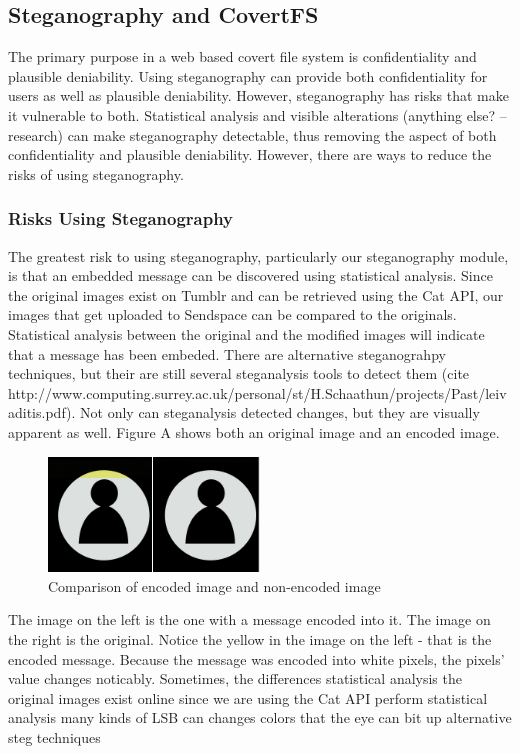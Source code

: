 \subsection{Steganography and CovertFS}
The primary purpose in a web based covert file system is confidentiality and plausible deniability. Using steganography can provide both confidentiality for users as well as plausible deniability. However, steganography has risks that make it vulnerable to both. Statistical analysis and visible alterations (anything else? -- research) can make steganography detectable, thus removing the aspect of both confidentiality and plausible deniability. However, there are ways to reduce the risks of using steganography. 

\subsubsection{Risks Using Steganography}
The greatest risk to using steganography, particularly our steganography module, is that an embedded message can be discovered using statistical analysis. Since the original images exist on Tumblr and can be retrieved using the Cat API, our images that get uploaded to Sendspace can be compared to the originals. Statistical analysis between the original and the modified images will indicate that a message has been embeded. There are alternative steganograhpy techniques, but their are still several steganalysis tools to detect them (cite http://www.computing.surrey.ac.uk/personal/st/H.Schaathun/projects/Past/leivaditis.pdf). Not only can steganalysis detected changes, but they are visually apparent as well. Figure A shows both an original image and an encoded image.
\begin{figure}
	\centering
	\includegraphics[width=0.5\textwidth]{comparison}
	\caption{Comparison of encoded image and non-encoded image}
\end{figure}
The image on the left is the one with a message encoded into it. The image on the right is the original. Notice the yellow in the image on the left - that is the encoded message. Because the message was encoded into white pixels, the pixels' value changes noticably.  
Sometimes, the differences 
statistical analysis
		the original images exist online since we are using the Cat API
		perform statistical analysis
	many kinds of LSB can changes colors that the eye can bit up
	alternative steg techniques

